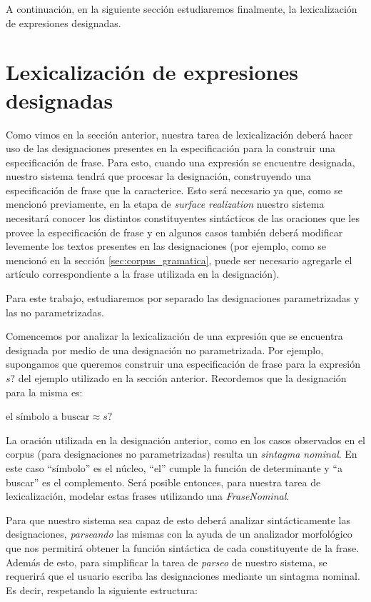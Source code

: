 A continuación, en la siguiente sección estudiaremos finalmente, la lexicalización de expresiones designadas.

\section{Lexicalización de expresiones designadas}
\label{sec:verbalizacion_designaciones}
Como vimos en la sección anterior, nuestra tarea de lexicalización deberá hacer uso de las designaciones presentes en la especificación para la construir una especificación de frase. Para esto, cuando una expresión se encuentre designada, nuestro sistema tendrá que procesar la designación, construyendo una especificación de frase que la caracterice. Esto será necesario ya que, como se mencionó previamente, en la etapa de \textit{surface realization} nuestro sistema necesitará conocer los distintos constituyentes sintácticos de las oraciones que les provee la especificación de frase y en algunos casos también deberá modificar levemente los textos presentes en las designaciones (por ejemplo, como se mencionó en la sección \ref{sec:corpus_gramatica}, puede ser necesario agregarle el artículo correspondiente a la frase utilizada en la designación).

Para este trabajo, estudiaremos por separado las designaciones parametrizadas y las no parametrizadas.

Comencemos por analizar la lexicalización de una expresión que se encuentra designada por medio de una designación no parametrizada. Por ejemplo, supongamos que queremos construir una especificación de frase para la expresión $s?$ del ejemplo utilizado en la sección anterior. Recordemos que la designación para la misma es:

\begin{center} 
  $\text{el símbolo a buscar} \approx s?$ 
\end{center}

La oración utilizada en la designación anterior, como en los casos observados en el corpus (para designaciones no parametrizadas) resulta un \emph{sintagma nominal}. En este caso ``símbolo'' es el núcleo, ``el'' cumple la función de determinante y ``a buscar'' es el complemento. Será posible entonces, para nuestra tarea de lexicalización, modelar estas frases utilizando una \emph{FraseNominal}. 

Para que nuestro sistema sea capaz de esto deberá analizar sintácticamente las designaciones, \textit{parseando} las mismas con la ayuda de un analizador morfológico que nos permitirá obtener la función sintáctica de cada constituyente de la frase. Además de esto, para simplificar la tarea de \emph{parseo} de nuestro sistema, se requerirá que el usuario escriba las designaciones mediante un sintagma nominal. Es decir, respetando la siguiente estructura:

